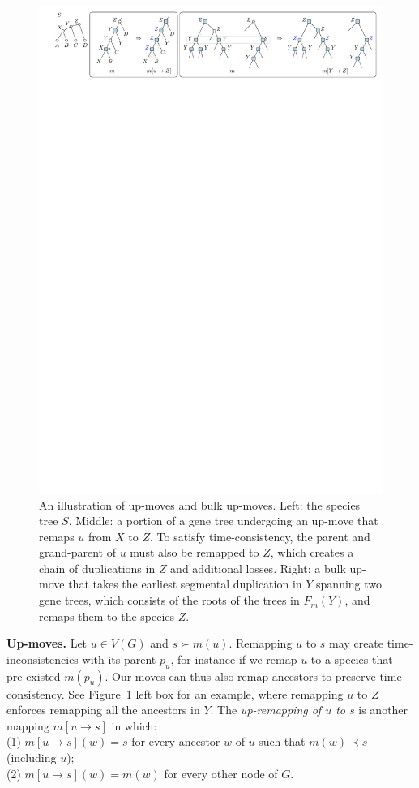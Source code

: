 \documentclass[10pt]{article}
\begin{document}
\begin{figure}[b]
    \centering
    \includegraphics[width=1\linewidth]{figs_theory/upmoves.pdf}
    \caption{An illustration of up-moves and bulk up-moves.  Left: the species tree $S$.  Middle: a portion of a gene tree undergoing an up-move that remaps $u$ from $X$ to $Z$.  To satisfy time-consistency, the parent and grand-parent of $u$ must also be remapped to $Z$, which creates a chain of duplications in $Z$ and additional losses.  Right: a bulk up-move that takes the earliest segmental duplication in $Y$ spanning two gene trees, which consists of the roots of the trees in $F_m(Y)$, and remaps them to the species $Z$.}
    \label{fig:up-moves}
\end{figure}

\medskip 

\noindent 
\textbf{Up-moves.}
Let $u \in V(G)$ and $s \succ m(u)$.  Remapping $u$ to $s$ may create time-inconsistencies with its parent $p_u$, for instance if we remap $u$ to a species that pre-existed $m(p_u)$.  Our moves can thus also remap ancestors to preserve time-consistency.  See Figure~\ref{fig:up-moves} left box for an example, where remapping $u$ to $Z$ enforces remapping all the ancestors in $Y$.
The \emph{up-remapping of $u$ to $s$} is another mapping $m[u \rightarrow s]$ in which: \\
(1) $m[u \rightarrow s](w) = s$ for every ancestor $w$ of $u$ such that $m(w) \prec s$ (including $u$); \\
(2) $m[u \rightarrow s](w) = m(w)$ for every other node of $G$.
\end{document}
